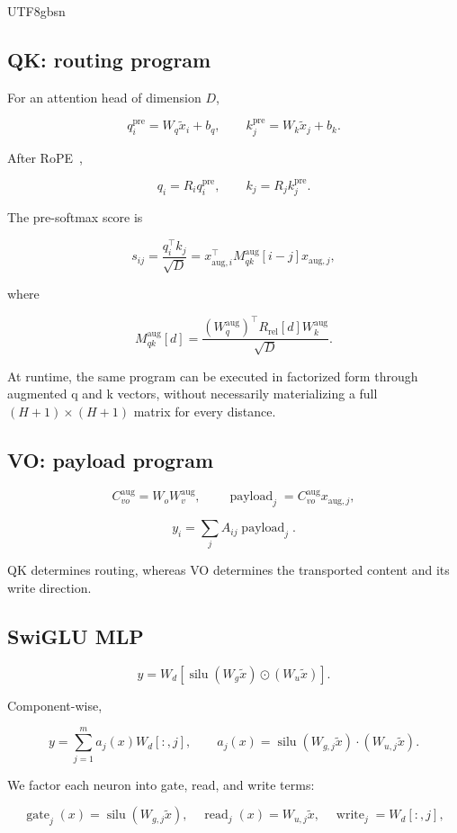 \documentclass[11pt]{article}
\begin{document}
\begin{CJK*}{UTF8}{gbsn}
\subsection{QK: routing program}

For an attention head of dimension \(D\),

\[
q_i^{\mathrm{pre}} = W_q\widetilde{x}_i+b_q,\qquad k_j^{\mathrm{pre}} = W_k\widetilde{x}_j+b_k.
\]

After RoPE~\citep{su2021roformer},

\[
q_i=R_iq_i^{\mathrm{pre}},\qquad k_j=R_jk_j^{\mathrm{pre}}.
\]

The pre-softmax score is

\[
s_{ij}=\frac{q_i^\top k_j}{\sqrt{D}} = x_{\mathrm{aug},i}^{\top} M^{\mathrm{aug}}_{qk}[i-j] x_{\mathrm{aug},j},
\]

where

\[
M^{\mathrm{aug}}_{qk}[d] = \frac{(W_q^{\mathrm{aug}})^\top R_{\mathrm{rel}}[d] W_k^{\mathrm{aug}}}{\sqrt{D}}.
\]

At runtime, the same program can be executed in factorized form through
augmented q and k vectors, without necessarily materializing a full
\((H+1)\times(H+1)\) matrix for every distance.

\subsection{VO: payload program}

\[
C^{\mathrm{aug}}_{vo}=W_oW_v^{\mathrm{aug}},\qquad \operatorname{payload}_j=C^{\mathrm{aug}}_{vo}x_{\mathrm{aug},j},
\]

\[
y_i=\sum_j A_{ij}\operatorname{payload}_j.
\]

QK determines routing, whereas VO determines the transported content and
its write direction.

\subsection{SwiGLU MLP}

\[
y=W_d\left[\operatorname{silu}(W_g\widetilde{x})\odot (W_u\widetilde{x})\right].
\]

Component-wise,

\[
y=\sum_{j=1}^{m} a_j(x)W_d[:,j],\qquad a_j(x)=\operatorname{silu}(W_{g,j}\widetilde{x})\cdot (W_{u,j}\widetilde{x}).
\]

We factor each neuron into gate, read, and write terms:

\[
\operatorname{gate}_j(x)=\operatorname{silu}(W_{g,j}\widetilde{x}),\quad
\operatorname{read}_j(x)=W_{u,j}\widetilde{x},\quad
\operatorname{write}_j=W_d[:,j],
\]


\end{CJK*}
\end{document}
